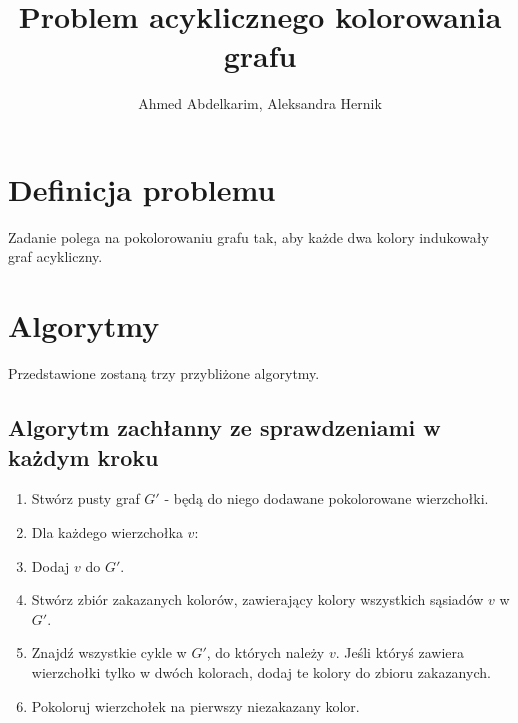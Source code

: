 \documentclass{article}
\title{Problem acyklicznego kolorowania grafu}
\author{Ahmed Abdelkarim, Aleksandra Hernik}
\begin{document}
\maketitle
\section{Definicja problemu}
Zadanie polega na pokolorowaniu grafu tak, aby każde dwa kolory indukowały graf acykliczny. 
\section{Algorytmy}
Przedstawione zostaną trzy przybliżone algorytmy.
\subsection{Algorytm zachłanny ze sprawdzeniami w każdym kroku}
\begin{enumerate}
\item Stwórz pusty graf $G'$ - będą do niego dodawane pokolorowane wierzchołki.
\item Dla każdego wierzchołka $v$:
\item Dodaj $v$ do $G'$.
\item Stwórz zbiór zakazanych kolorów, zawierający kolory wszystkich sąsiadów $v$ w $G'$.
\item Znajdź wszystkie cykle w $G'$, do których należy $v$. Jeśli któryś zawiera wierzchołki tylko w dwóch kolorach, dodaj te kolory do zbioru zakazanych.
\item Pokoloruj wierzchołek na pierwszy niezakazany kolor.
  
\end{enumerate}
\end{document}
